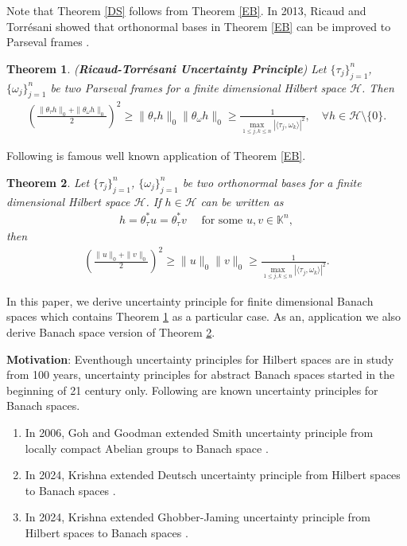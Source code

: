 \documentclass{amsart}
\newtheorem{theorem}{Theorem}[section]
\begin{document}
Note that Theorem \ref{DS} follows from Theorem \ref{EB}. In 2013, Ricaud and Torr\'{e}sani  showed that orthonormal bases in Theorem \ref{EB} can be improved to Parseval frames \cite{RICAUDTORRESANI}.
\begin{theorem} (\textbf{Ricaud-Torr\'{e}sani Uncertainty Principle}) \cite{RICAUDTORRESANI} \label{RT}
	Let $\{\tau_j\}_{j=1}^n$,  $\{\omega_j\}_{j=1}^n$ be two Parseval frames   for a  finite dimensional Hilbert space $\mathcal{H}$. Then 
\begin{align*}
	\left(\frac{\|\theta_\tau h\|_0+\|\theta_\omega h\|_0}{2}\right)^2	\geq \|\theta_\tau h\|_0\|\theta_\omega h\|_0\geq \frac{1}{\displaystyle\max_{1\leq j, k \leq n}|\langle\tau_j, \omega_k \rangle|^2}, \quad \forall h \in \mathcal{H}\setminus \{0\}.
		\end{align*}	
\end{theorem}
Following is famous  well known  application of Theorem \ref{EB}.
\begin{theorem} \cite{ELADBOOK, ELADBRUCKSTEIN} \label{APP}
	Let $\{\tau_j\}_{j=1}^n$,  $\{\omega_j\}_{j=1}^n$ be two orthonormal bases for a  finite dimensional Hilbert space $\mathcal{H}$. If $h \in \mathcal{H}$ can be written as 
	\begin{align*}
		h=\theta_\tau^*u=\theta_\tau^*v \quad \text{ for some } u, v \in \mathbb{K}^n, 
	\end{align*}
then 
\begin{align*}
	\left(\frac{\|u\|_0+\|v\|_0}{2}\right)^2	\geq	\|u\|_0\|v\|_0\geq \frac{1}{\displaystyle\max_{1\leq j, k \leq n}|\langle\tau_j, \omega_k \rangle|^2}.
\end{align*}
\end{theorem}

In this paper, we derive uncertainty principle for finite dimensional Banach spaces which contains Theorem \ref{RT} as a particular case. As  an, application we also derive Banach space version of Theorem \ref{APP}.


\textbf{Motivation}: Eventhough uncertainty principles for Hilbert spaces are in study from 100 years, uncertainty principles for abstract Banach spaces started in the beginning of 21 century only. Following are known uncertainty principles for Banach spaces. 
\begin{enumerate}
	\item  In 2006, Goh and Goodman extended Smith uncertainty principle from locally compact Abelian groups to Banach space \cite{GOHGOODMAN, SMITH}.
	\item In 2024, Krishna  extended Deutsch uncertainty principle from Hilbert spaces to Banach spaces \cite{KRISHNA3, DEUTSCH}.
	\item In 2024, Krishna extended Ghobber-Jaming uncertainty principle from Hilbert spaces to Banach spaces \cite{KRISHNA3, GHOBBERJAMING}.
\end{enumerate}
\end{document}
